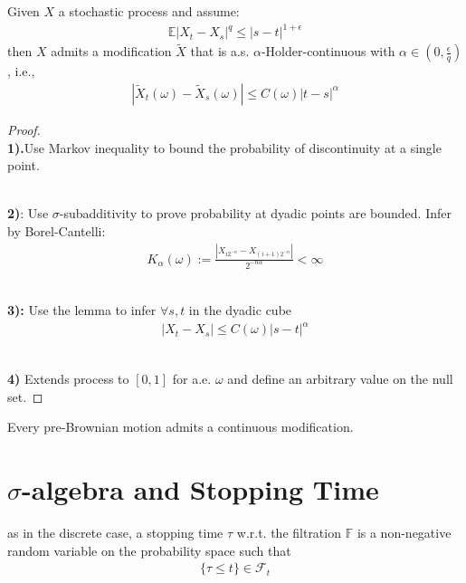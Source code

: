 \begin{theorem}
Given $X$ a stochastic process and assume:
\begin{align*}
	\mathbb{E} | X_t - X_s|^q \le |s - t|^{ 1 + \epsilon}
\end{align*}
then $X$ admits a modification $\tilde{X}$ that is a.s. $\alpha$-Holder-continuous with $\alpha \in (0, \frac{\epsilon}{q})$ , i.e., 
\begin{align*}
	|\tilde{X}_t(\omega) - \tilde{X}_s(\omega) | \le C(\omega) |t - s|^\alpha 
\end{align*}
\end{theorem}
\begin{proof}\quad\\
\textbf{1).}Use Markov inequality to bound the probability of discontinuity at a single point. 

\quad\\
\textbf{2)}: Use $\sigma$-subadditivity to prove probability at dyadic points are bounded. Infer by Borel-Cantelli:
\begin{align*}
	K_\alpha(\omega):= \frac{|X_{i 2^{-n}} - X_{(i +1) 2^{- n}}|}{2^{-n \alpha}} < \infty
\end{align*}

\quad\\
\textbf{3):} Use the lemma to infer $\forall s, t$ in the dyadic cube
\begin{align*}
	|X_t - X_s| \le C(\omega) |s - t|^\alpha
\end{align*}

\quad\\
\textbf{4)} Extends process to $[0, 1]$ for a.e. $\omega$ and define an arbitrary value on the null set. 
\end{proof}

\begin{corollary}
	Every pre-Brownian motion admits a continuous modification. 
\end{corollary}


\section{\texorpdfstring{$\sigma$}{sigma}-algebra and Stopping Time}
\begin{definition}
	as in the discrete case, a stopping time $\tau$ w.r.t. the filtration $\mathbb{F}$ is a non-negative random variable on the probability space such that
	\begin{align*}
		\{ \tau \le t \} \in \mathcal{F}_t
	\end{align*}
\end{definition}

